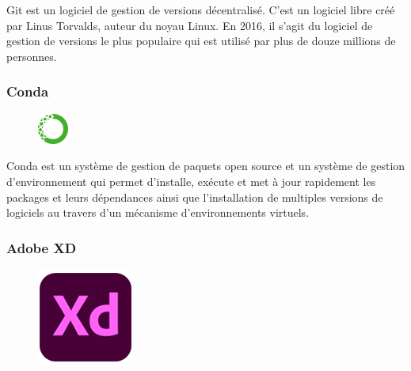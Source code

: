 Git est un logiciel de gestion de versions décentralisé. C’est un logiciel libre 
créé par Linus Torvalds, auteur du noyau Linux. En 2016, il s’agit du logiciel 
de gestion de versions le plus populaire qui est utilisé par plus de douze 
millions de personnes\cite{43}.
            
            
\subsubsection*{Conda}
    \begin{figure}
        \vspace{-36pt}
        \begin{center}
            \includegraphics[width=0.09\textwidth]{images/Conda logo.png}
            \label{fig68}
        \end{center}
        \vspace{-20pt}
        \vspace{-10pt}
    \end{figure}

Conda est un système de gestion de paquets open source et un système de gestion 
d’environnement qui permet d’installe, exécute et met à jour rapidement les 
packages et leurs dépendances ainsi que l’installation de multiples versions de 
logiciels au travers d’un mécanisme d’environnements virtuels\cite{44}.
            
        
\subsubsection*{Adobe XD}
    \begin{figure}
        \vspace{-22pt}
        \begin{center}
          \includegraphics[scale=0.36]{images/logo/adobexd.png}
          \label{fig69}
        \end{center}
        \vspace{-20pt}
        \vspace{-10pt}
    \end{figure}

